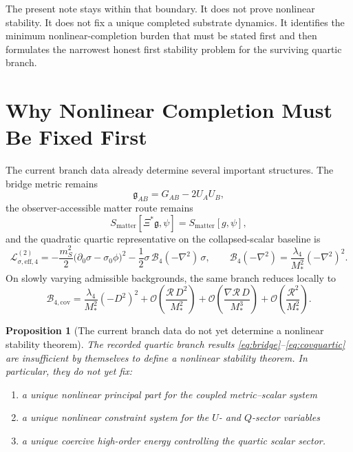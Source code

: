 \documentclass[11pt]{article}
\newcommand{\BridgeMetric}{\mathfrak{g}}
\newtheorem{proposition}{Proposition}
\begin{document}
The present note stays within that boundary. It does not prove nonlinear stability. It does not fix a unique completed substrate dynamics. It identifies the minimum nonlinear-completion burden that must be stated first and then formulates the narrowest honest first stability problem for the surviving quartic branch.

\section{Why Nonlinear Completion Must Be Fixed First}

The current branch data already determine several important structures. The bridge metric remains
\begin{equation}
\BridgeMetric_{AB}=G_{AB}-2U_AU_B,
\label{eq:bridge}
\end{equation}
the observer-accessible matter route remains
\begin{equation}
S_{\mathrm{matter}}[\Xi^*\BridgeMetric,\psi]
=
S_{\mathrm{matter}}[g,\psi],
\label{eq:matterroute}
\end{equation}
and the quadratic quartic representative on the collapsed-scalar baseline is
\begin{equation}
\mathcal L_{\sigma,\mathrm{eff},4}^{(2)}
=
-\frac{m_S^2}{2}\bigl(\partial_0\sigma-\sigma_0\phi\bigr)^2
-\frac{1}{2}\sigma\,\mathcal B_4(-\nabla^2)\,\sigma,
\qquad
\mathcal B_4(-\nabla^2)=\frac{\lambda_4}{M_*^2}(-\nabla^2)^2.
\label{eq:quadraticquartic}
\end{equation}
On slowly varying admissible backgrounds, the same branch reduces locally to
\begin{equation}
\mathcal B_{4,\mathrm{cov}}
=
\frac{\lambda_4}{M_*^2}(-D^2)^2
+ \mathcal O\!\left(\frac{\mathcal R\,D^2}{M_*^2}\right)
+ \mathcal O\!\left(\frac{\nabla\mathcal R\,D}{M_*^3}\right)
+ \mathcal O\!\left(\frac{\mathcal R^2}{M_*^2}\right).
\label{eq:covquartic}
\end{equation}

\begin{proposition}[The current branch data do not yet determine a nonlinear stability theorem]
The recorded quartic branch results \eqref{eq:bridge}--\eqref{eq:covquartic} are insufficient by themselves to define a nonlinear stability theorem. In particular, they do not yet fix:
\begin{enumerate}
    \item a unique nonlinear principal part for the coupled metric--scalar system
    \item a unique nonlinear constraint system for the \(U\)- and \(Q\)-sector variables
    \item a unique coercive high-order energy controlling the quartic scalar sector.
\end{enumerate}
\end{proposition}
\end{document}
